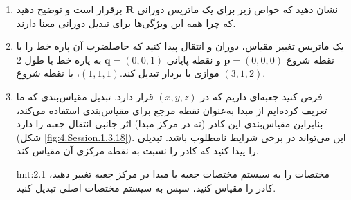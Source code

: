 {\begin{spacing}{1.5}
\begin{enumerate}[label=\textbf{\arabic*}.]
            \item {
                نشان دهید که خواص زیر برای یک ماتریس دورانی $\textbf{R}$ برقرار است و توضیح دهید که چرا همه این ویژگی‌ها برای تبدیل دورانی معنا دارند.
                 \textbf{\vspace{-6pt}}
            }

            \item {یک ماتریس تغییر مقیاس، دوران و انتقال پیدا کنید که حاصلضرب آن پاره خط را با نقطه شروع $\textbf{p}=(0,0,0)$ و نقطه پایانی $\textbf{q}=(0,0,1)$ به پاره خط با طول $2$ موازی با بردار تبدیل کند.$(1,1,1)$، با نقطه شروع $(3,1,2)$.}

            \item {
                فرض کنید جعبه‌ای داریم که در $(x,y,z)$ قرار دارد. تبدیل مقیاس‌بندی که ما تعریف کرده‌ایم از مبدا به‌عنوان نقطه مرجع برای مقیاس‌بندی استفاده می‌کند،
                بنابراین مقیاس‌بندی این کادر (نه در مرکز مبدا) اثر جانبی انتقال جعبه را دارد (شکل \ref{fig:4.Session.1.3.18}).
                این می‌تواند در برخی شرایط نامطلوب باشد. تبدیلی را پیدا کنید که کادر را نسبت به نقطه مرکزی آن مقیاس کند.

                \begin{hint}{hnt:2.1}
                    \Large
                    مختصات را به سیستم مختصات جعبه با مبدا در مرکز جعبه تغییر دهید، کادر را مقیاس کنید، سپس به سیستم مختصات اصلی تبدیل کنید.
                \end{hint} \\

}
\end{enumerate}
\end{spacing}}

